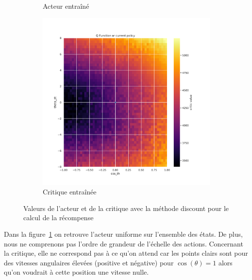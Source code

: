 \begin{figure}[H]
\begin{subfigure}{0.3\textwidth}
        \caption{Acteur entraîné}
    \end{subfigure}
    \begin{subfigure}{0.3\textwidth}
        \includegraphics[width=\textwidth]{figures/iteration2/0_critic_discount_post_Pendulum-v0.pdf}
        \caption{Critique entraînée}
    \end{subfigure}
    \caption{Valeurs de l'acteur et de la critique avec la méthode discount pour le calcul de la récompense}
    \label{fig:itr2_discount}
\end{figure}

Dans la figure~\ref{fig:itr2_discount} on retrouve l'acteur uniforme sur l'ensemble des états. De plus, nous ne comprenons pas l'ordre de grandeur de l'échelle des actions. Concernant la critique, elle ne correspond pas à ce qu'on attend car les points clairs sont pour des vitesses angulaires élevées (positive et négative) pour $\cos(\theta) = 1$ alors qu'on voudrait à cette position une vitesse nulle. 

